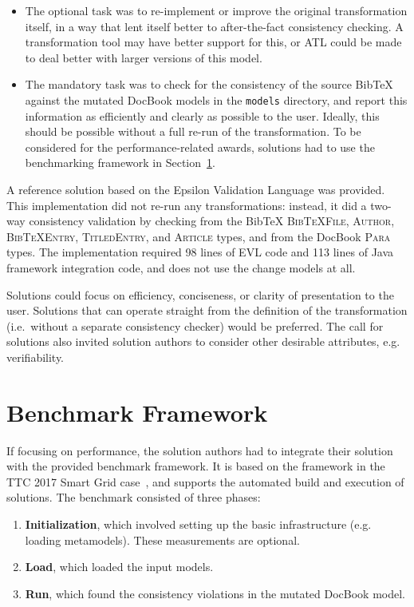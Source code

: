 \documentclass[a4paper]{article}
\newcommand*{\class}[1]{\textsc{#1}}
\newcommand*{\file}[1]{\texttt{#1}}
\begin{document}
\begin{itemize}
\item The optional task was to re-implement or improve the original
  transformation itself, in a way that lent itself better to after-the-fact
  consistency checking. A transformation tool may have better support for this,
  or ATL could be made to deal better with larger versions of this model.

\item The mandatory task was to check for the consistency of the source BibTeX
  against the mutated DocBook models in the \file{models} directory, and report
  this information as efficiently and clearly as possible to the user. Ideally,
  this should be possible without a full re-run of the transformation. To be
  considered for the performance-related awards, solutions had to use the
  benchmarking framework in Section~\ref{sec:benchmark-framework}.
\end{itemize}

A reference solution based on the Epsilon Validation Language was provided. This
implementation did not re-run any transformations: instead, it did a two-way
consistency validation by checking from the BibTeX \class{BibTeXFile},
\class{Author}, \class{BibTeXEntry}, \class{TitledEntry}, and \class{Article}
types, and from the DocBook \class{Para} types. The implementation required 98
lines of EVL code and 113 lines of Java framework integration code, and does not
use the change models at all.

Solutions could focus on efficiency, conciseness, or clarity of presentation to
the user. Solutions that can operate straight from the definition of the
transformation (i.e.\ without a separate consistency checker) would be
preferred. The call for solutions also invited solution authors to consider
other desirable attributes, e.g. verifiability.

\section{Benchmark Framework}
\label{sec:benchmark-framework}

If focusing on performance, the solution authors had to integrate their solution
with the provided benchmark framework. It is based on the framework in the TTC
2017 Smart Grid case~\cite{hinkel_ttc_2017}, and supports the automated build
and execution of solutions. The benchmark consisted of three phases:

\begin{enumerate}
\item \textbf{Initialization}, which involved setting up the basic
  infrastructure (e.g. loading metamodels). These measurements are optional.
\item \textbf{Load}, which loaded the input models.
\item \textbf{Run}, which found the consistency violations in the mutated
  DocBook model.
\end{enumerate}
\end{document}

